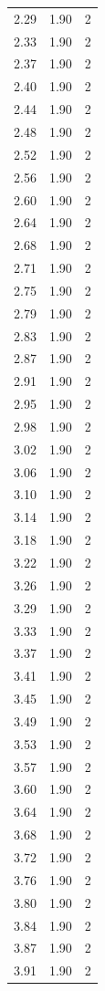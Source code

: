 \begin{longtable}{lrr}
  2.29 & 1.90 & 2 \\
  2.33 & 1.90 & 2 \\
  2.37 & 1.90 & 2 \\
  2.40 & 1.90 & 2 \\
  2.44 & 1.90 & 2 \\
  2.48 & 1.90 & 2 \\
  2.52 & 1.90 & 2 \\
  2.56 & 1.90 & 2 \\
  2.60 & 1.90 & 2 \\
  2.64 & 1.90 & 2 \\
  2.68 & 1.90 & 2 \\
  2.71 & 1.90 & 2 \\
  2.75 & 1.90 & 2 \\
  2.79 & 1.90 & 2 \\
  2.83 & 1.90 & 2 \\
  2.87 & 1.90 & 2 \\
  2.91 & 1.90 & 2 \\
  2.95 & 1.90 & 2 \\
  2.98 & 1.90 & 2 \\
  3.02 & 1.90 & 2 \\
  3.06 & 1.90 & 2 \\
  3.10 & 1.90 & 2 \\
  3.14 & 1.90 & 2 \\
  3.18 & 1.90 & 2 \\
  3.22 & 1.90 & 2 \\
  3.26 & 1.90 & 2 \\
  3.29 & 1.90 & 2 \\
  3.33 & 1.90 & 2 \\
  3.37 & 1.90 & 2 \\
  3.41 & 1.90 & 2 \\
  3.45 & 1.90 & 2 \\
  3.49 & 1.90 & 2 \\
  3.53 & 1.90 & 2 \\
  3.57 & 1.90 & 2 \\
  3.60 & 1.90 & 2 \\
  3.64 & 1.90 & 2 \\
  3.68 & 1.90 & 2 \\
  3.72 & 1.90 & 2 \\
  3.76 & 1.90 & 2 \\
  3.80 & 1.90 & 2 \\
  3.84 & 1.90 & 2 \\
  3.87 & 1.90 & 2 \\
  3.91 & 1.90 & 2 \\

\end{longtable}
